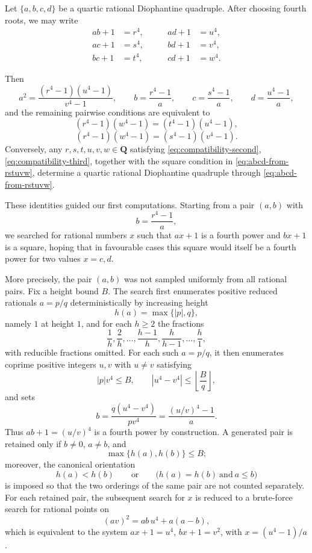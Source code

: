 \documentclass[11pt]{article}
\newcommand{\Q}{\mathbf{Q}}
\begin{document}
Let $\{a,b,c,d\}$ be a quartic rational Diophantine quadruple. After choosing fourth roots, we may write
\begin{equation}\label{eq:rstuvw-def}
\begin{alignedat}{2}
ab+1&=r^4,  &\qquad ad+1&=u^4, \\
ac+1&=s^4,  &\qquad bd+1&=v^4, \\
bc+1&=t^4,  &\qquad cd+1&=w^4.
\end{alignedat}
\end{equation}

Then
\begin{equation}\label{eq:abcd-from-rstuvw}
a^2=\frac{(r^4-1)(u^4-1)}{v^4-1},\qquad
b=\frac{r^4-1}{a},\qquad
c=\frac{s^4-1}{a},\qquad
d=\frac{u^4-1}{a},
\end{equation}
and the remaining pairwise conditions are equivalent to
\begin{equation}\label{eq:compatibility-second}
(r^4-1)(w^4-1)=(t^4-1)(u^4-1),
\end{equation}
\begin{equation}\label{eq:compatibility-third}
(r^4-1)(w^4-1)=(s^4-1)(v^4-1).
\end{equation}
Conversely, any $r,s,t,u,v,w\in\Q$ satisfying \eqref{eq:compatibility-second}, \eqref{eq:compatibility-third}, together with the square condition in \eqref{eq:abcd-from-rstuvw}, determine a quartic rational Diophantine quadruple through \eqref{eq:abcd-from-rstuvw}.

These identities guided our first computations. Starting from a pair $(a,b)$ with
\[
b=\frac{r^4-1}{a},
\]
we searched for rational numbers $x$ such that $ax+1$ is a fourth power and $bx+1$ is a square, hoping that in favourable cases this square would itself be a fourth power for two values $x=c,d$.



More precisely, the pair $(a,b)$ was not sampled uniformly from all rational pairs. Fix a height bound $B$. The search first enumerates positive reduced rationals $a=p/q$ deterministically by increasing height
\[
h(a)=\max\{|p|,q\},
\]
namely $1$ at height $1$, and for each $h\ge 2$ the fractions
\[
\frac1h,\frac2h,\ldots,\frac{h-1}{h},\frac{h}{h-1},\ldots,\frac{h}{1},
\]
with reducible fractions omitted. For each such $a=p/q$, it then enumerates coprime positive integers $u,v$ with $u\neq v$ satisfying
\[
|p|v^4\le B,\qquad |u^4-v^4|\le \left\lfloor \frac{B}{q}\right\rfloor,
\]
and sets
\[
b=\frac{q(u^4-v^4)}{pv^4}=\frac{(u/v)^4-1}{a}.
\]
Thus $ab+1=(u/v)^4$ is a fourth power by construction. A generated pair is retained only if $b\neq 0$, $a\neq b$, and
\[
\max\{h(a),h(b)\}\le B;
\]
moreover, the canonical orientation
\[
h(a)<h(b)\qquad\text{or}\qquad \bigl(h(a)=h(b)\ \text{and}\ a\le b\bigr)
\]
is imposed so that the two orderings of the same pair are not counted separately. For each retained pair, the subsequent search for $x$ is reduced to a brute-force search for rational points on
\[
(av)^2=ab\,u^4+a(a-b),
\]
which is equivalent to the system $ax+1=u^4$, $bx+1=v^2$, with $x=(u^4-1)/a$.
\end{document}
